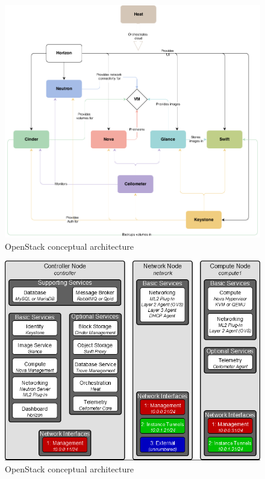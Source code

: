 \begin{figure}[ht!]
\centering
\includegraphics[width=\textwidth]{openstack_conceptual_architecture.png}
\caption{OpenStack conceptual architecture}
\label{overflow}
\end{figure}


\begin{figure}[ht!]
\centering
\includegraphics[width=\textwidth]{openstack_architecture.png}
\caption{OpenStack conceptual architecture}
\label{overflow}
\end{figure}

